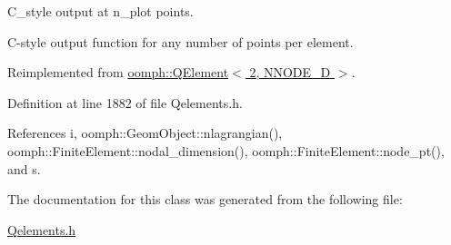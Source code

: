 C\+\_\+style output at n\+\_\+plot points. 

C-\/style output function for any number of points per element. 

Reimplemented from \hyperlink{classoomph_1_1QElement_3_012_00_01NNODE__1D_01_4_aeaa407209398e3c0daf6968520d774ec}{oomph\+::\+Q\+Element$<$ 2, N\+N\+O\+D\+E\+\_\+D $>$}.



Definition at line 1882 of file Qelements.\+h.



References i, oomph\+::\+Geom\+Object\+::nlagrangian(), oomph\+::\+Finite\+Element\+::nodal\+\_\+dimension(), oomph\+::\+Finite\+Element\+::node\+\_\+pt(), and s.



The documentation for this class was generated from the following file\+:\begin{DoxyCompactItemize}
\item 
\hyperlink{Qelements_8h}{Qelements.\+h}\end{DoxyCompactItemize}
